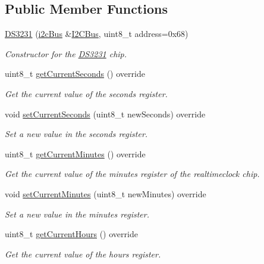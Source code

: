 \subsection*{Public Member Functions}
\begin{DoxyCompactItemize}
\item 
\mbox{\hyperlink{class_d_s3231_ac1f8a5e8553eebfb90dbb432f00812a3}{D\+S3231}} (\mbox{\hyperlink{classi2c_bus}{i2c\+Bus}} \&\mbox{\hyperlink{class_d_s3231_acffbcfc655349fd392b97dff5f18a56f}{I2\+C\+Bus}}, uint8\+\_\+t address=0x68)
\begin{DoxyCompactList}\small\item\em Constructor for the \mbox{\hyperlink{class_d_s3231}{D\+S3231}} chip. \end{DoxyCompactList}\item 
uint8\+\_\+t \mbox{\hyperlink{class_d_s3231_a8a5357eae07991d94f8f7610a3f3073a}{get\+Current\+Seconds}} () override
\begin{DoxyCompactList}\small\item\em Get the current value of the seconds register. \end{DoxyCompactList}\item 
void \mbox{\hyperlink{class_d_s3231_ac73512cc6c2a37ffb21bee74ea835a09}{set\+Current\+Seconds}} (uint8\+\_\+t new\+Seconds) override
\begin{DoxyCompactList}\small\item\em Set a new value in the seconds register. \end{DoxyCompactList}\item 
uint8\+\_\+t \mbox{\hyperlink{class_d_s3231_a08f384e1897214d4a201aaaecde3b8a4}{get\+Current\+Minutes}} () override
\begin{DoxyCompactList}\small\item\em Get the current value of the minutes register of the realtimeclock chip. \end{DoxyCompactList}\item 
void \mbox{\hyperlink{class_d_s3231_a221f92091b813108b3515f6676be29c8}{set\+Current\+Minutes}} (uint8\+\_\+t new\+Minutes) override
\begin{DoxyCompactList}\small\item\em Set a new value in the minutes register. \end{DoxyCompactList}\item 
uint8\+\_\+t \mbox{\hyperlink{class_d_s3231_a019d8ed8074a02937c0777424be3d0ae}{get\+Current\+Hours}} () override
\begin{DoxyCompactList}\small\item\em Get the current value of the hours register. \end{DoxyCompactList}\item 

\end{DoxyCompactItemize}
